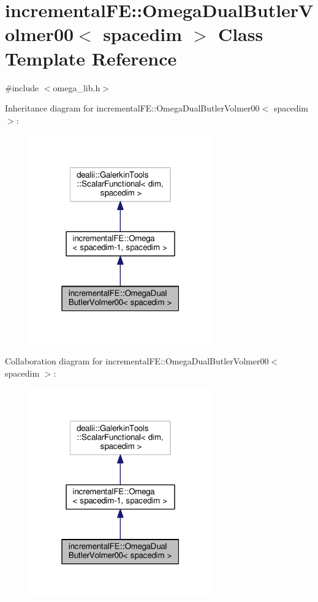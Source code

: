 \hypertarget{classincremental_f_e_1_1_omega_dual_butler_volmer00}{}\section{incremental\+FE\+:\+:Omega\+Dual\+Butler\+Volmer00$<$ spacedim $>$ Class Template Reference}
\label{classincremental_f_e_1_1_omega_dual_butler_volmer00}


{\ttfamily \#include $<$omega\+\_\+lib.\+h$>$}



Inheritance diagram for incremental\+FE\+:\+:Omega\+Dual\+Butler\+Volmer00$<$ spacedim $>$\+:\nopagebreak
\begin{figure}[H]
\begin{center}
\leavevmode
\includegraphics[width=223pt]{classincremental_f_e_1_1_omega_dual_butler_volmer00__inherit__graph}
\end{center}
\end{figure}


Collaboration diagram for incremental\+FE\+:\+:Omega\+Dual\+Butler\+Volmer00$<$ spacedim $>$\+:\nopagebreak
\begin{figure}[H]
\begin{center}
\leavevmode
\includegraphics[width=223pt]{classincremental_f_e_1_1_omega_dual_butler_volmer00__coll__graph}
\end{center}
\end{figure}

